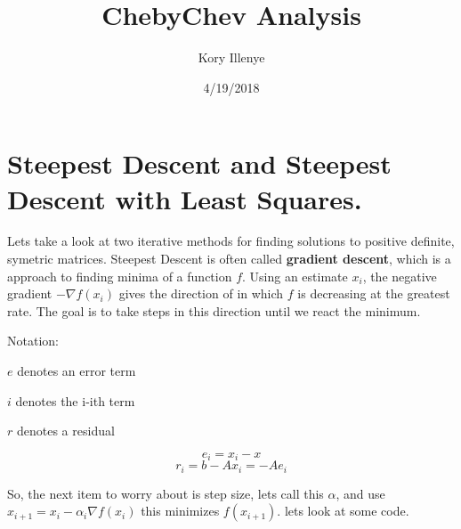 \documentclass[]{article}
\title{ChebyChev Analysis}
\author{Kory Illenye}
\date{4/19/2018}
\newenvironment{Shaded}{\begin{snugshade}}{\end{snugshade}}
\newcommand{\KeywordTok}[1]{\textcolor[rgb]{0.13,0.29,0.53}{\textbf{#1}}}
\newcommand{\DataTypeTok}[1]{\textcolor[rgb]{0.13,0.29,0.53}{#1}}
\newcommand{\DecValTok}[1]{\textcolor[rgb]{0.00,0.00,0.81}{#1}}
\newcommand{\FloatTok}[1]{\textcolor[rgb]{0.00,0.00,0.81}{#1}}
\newcommand{\StringTok}[1]{\textcolor[rgb]{0.31,0.60,0.02}{#1}}
\newcommand{\CommentTok}[1]{\textcolor[rgb]{0.56,0.35,0.01}{\textit{#1}}}
\newcommand{\OperatorTok}[1]{\textcolor[rgb]{0.81,0.36,0.00}{\textbf{#1}}}
\newcommand{\NormalTok}[1]{#1}
\begin{document}
\maketitle

\section{Steepest Descent and Steepest Descent with Least
Squares.}\label{steepest-descent-and-steepest-descent-with-least-squares.}

Lets take a look at two iterative methods for finding solutions to
positive definite, symetric matrices. Steepest Descent is often called
\textbf{gradient descent}, which is a approach to finding minima of a
function \(f\). Using an estimate \(x_i\), the negative gradient
\(-\nabla f(x_i)\) gives the direction of in which \(f\) is decreasing
at the greatest rate. The goal is to take steps in this direction until
we react the minimum.

Notation:

\(e\) denotes an error term

\(i\) denotes the i-ith term

\(r\) denotes a residual

\[e_i = x_i - x\] \[r_i = b - Ax_i = -Ae_i\]

So, the next item to worry about is step size, lets call this
\(\alpha\), and use \(x_{i+1} = x_i - \alpha_i\nabla f(x_i)\) this
minimizes \(f(x_{i+1})\). lets look at some code.

\begin{Shaded}
\end{Shaded}
\end{document}

